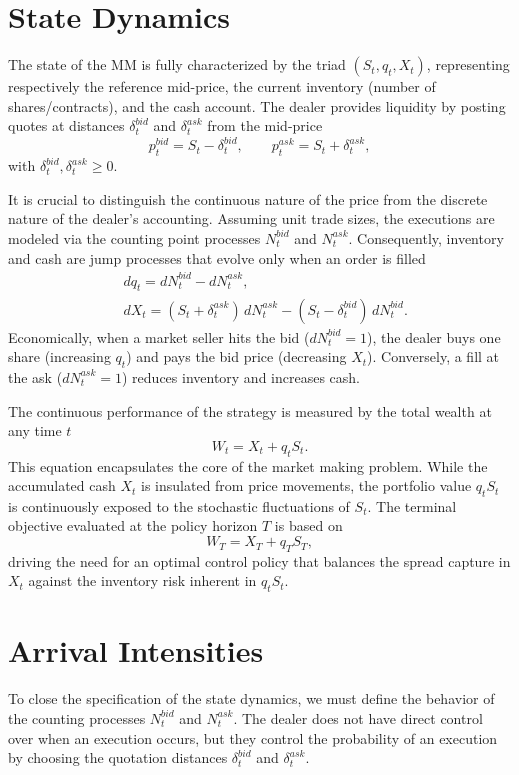 \documentclass[a4paper,10pt,titlepage,oneside,openany]{book}
\theoremstyle{plain}\newtheorem{theorem}{Theorem}[chapter]
\theoremstyle{definition}\newtheorem{definition}{Definition}[chapter]
\theoremstyle{remark}\newtheorem{remark}{Remark}[chapter]
\begin{document}
\section{State Dynamics}
The state of the MM is fully characterized by the triad $(S_t, q_t, X_t)$, representing respectively the reference mid-price, the current inventory (number of shares/contracts), and the cash account. The dealer provides liquidity by posting quotes at distances $\delta_t^{bid}$ and $\delta_t^{ask}$ from the mid-price
\[
p_t^{bid}=S_t-\delta_t^{bid}, \qquad p_t^{ask}=S_t+\delta_t^{ask},
\]
with $\delta_t^{bid},\delta_t^{ask}\ge 0$.

It is crucial to distinguish the continuous nature of the price from the discrete nature of the dealer's accounting. Assuming unit trade sizes, the executions are modeled via the counting point processes $N_t^{bid}$ and $N_t^{ask}$. Consequently, inventory and cash are jump processes that evolve only when an order is filled
\begin{align*}
    &dq_t=dN_t^{bid}-dN_t^{ask},\\
    &dX_t=(S_t+\delta_t^{ask})\,dN_t^{ask}-(S_t-\delta_t^{bid})\,dN_t^{bid}.
\end{align*}
Economically, when a market seller hits the bid ($dN_t^{bid}=1$), the dealer buys one share (increasing $q_t$) and pays the bid price (decreasing $X_t$). Conversely, a fill at the ask ($dN_t^{ask}=1$) reduces inventory and increases cash.

The continuous performance of the strategy is measured by the total wealth at any time $t$
\[
W_t=X_t+q_tS_t.
\]
This equation encapsulates the core of the market making problem. While the accumulated cash $X_t$ is insulated from price movements, the portfolio value $q_tS_t$ is continuously exposed to the stochastic fluctuations of $S_t$. The terminal objective evaluated at the policy horizon $T$ is based on 
\[
W_T=X_T+q_TS_T,
\]
driving the need for an optimal control policy that balances the spread capture in $X_t$ against the inventory risk inherent in $q_tS_t$.

\section{Arrival Intensities}
To close the specification of the state dynamics, we must define the behavior of the counting processes $N_t^{bid}$ and $N_t^{ask}$. The dealer does not have direct control over when an execution occurs, but they control the probability of an execution by choosing the quotation distances $\delta_t^{bid}$ and $\delta_t^{ask}$.
\end{document}
